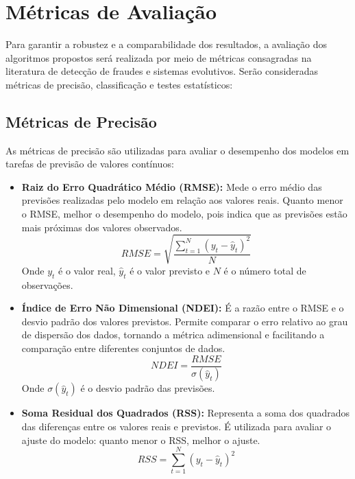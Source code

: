 \section{Métricas de Avaliação}

Para garantir a robustez e a comparabilidade dos resultados, a avaliação dos algoritmos propostos será realizada por meio de métricas consagradas na literatura de detecção de fraudes e sistemas evolutivos. Serão consideradas métricas de precisão, classificação e testes estatísticos:


\subsection{Métricas de Precisão}
As métricas de precisão são utilizadas para avaliar o desempenho dos modelos em tarefas de previsão de valores contínuos:
\begin{itemize}
    \item \textbf{Raiz do Erro Quadrático Médio (RMSE):} Mede o erro médio das previsões realizadas pelo modelo em relação aos valores reais. Quanto menor o RMSE, melhor o desempenho do modelo, pois indica que as previsões estão mais próximas dos valores observados.
    \[RMSE = \sqrt{\frac{\sum_{t=1}^{N}(y_t - \hat{y}_t)^2}{N}}\]
    Onde $y_t$ é o valor real, $\hat{y}_t$ é o valor previsto e $N$ é o número total de observações.
    \item \textbf{Índice de Erro Não Dimensional (NDEI):} É a razão entre o RMSE e o desvio padrão dos valores previstos. Permite comparar o erro relativo ao grau de dispersão dos dados, tornando a métrica adimensional e facilitando a comparação entre diferentes conjuntos de dados.
    \[NDEI = \frac{RMSE}{\sigma(\hat{y}_t)}\]
    Onde $\sigma(\hat{y}_t)$ é o desvio padrão das previsões.
    \item \textbf{Soma Residual dos Quadrados (RSS):} Representa a soma dos quadrados das diferenças entre os valores reais e previstos. É utilizada para avaliar o ajuste do modelo: quanto menor o RSS, melhor o ajuste.
    \[RSS = \sum_{t=1}^{N}(y_t - \hat{y}_t)^2\]
\end{itemize}


